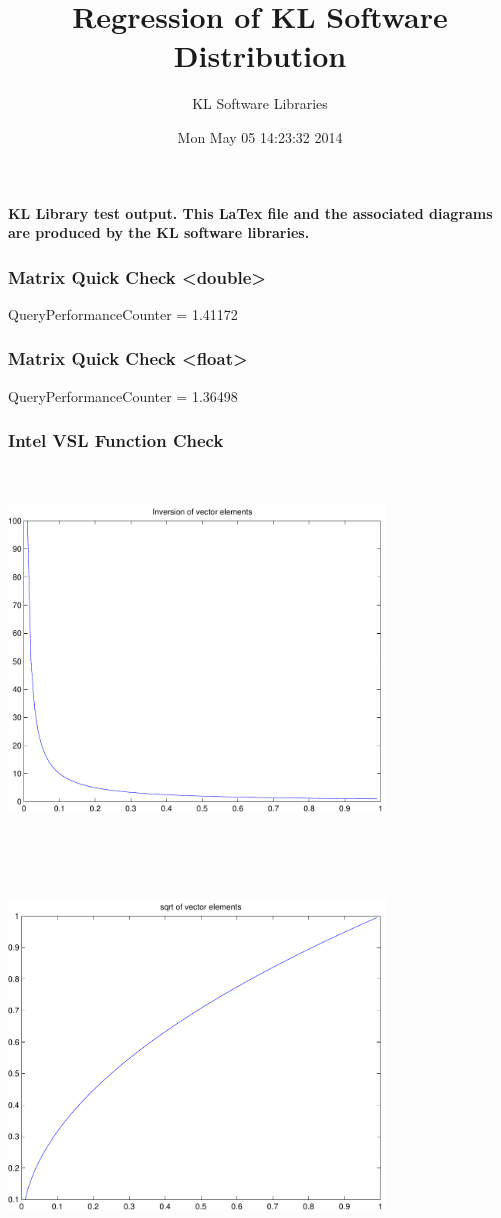 \documentclass[9pt]{article}
\theoremstyle{plain}
\theoremstyle{definition}
\theoremstyle{remark}
\numberwithin{equation}{section}
\begin{document}
\title{Regression of KL Software Distribution   }
\author{KL Software Libraries}
\date{Mon May 05 14:23:32 2014
}
\maketitle
\textbf{ KL Library test output.  This LaTex file and the associated diagrams are produced by the KL software libraries.}
\subsubsection{Matrix Quick Check <double>}
QueryPerformanceCounter  =  1.41172
\subsubsection{Matrix Quick Check <float>}
QueryPerformanceCounter  =  1.36498
\subsubsection{Intel VSL Function Check}
\includegraphics[width=10.0cm,height=10.0cm]{klVSLInv.pdf}

\includegraphics[width=10.0cm,height=10.0cm]{klVSLSqrt.pdf}
\end{document}
